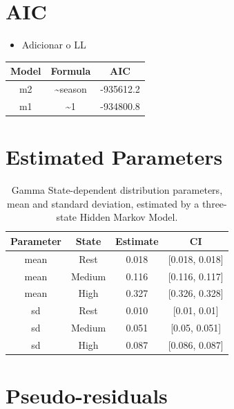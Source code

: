 \documentclass[msc,numbers,hidelinks]{coppe}
\providecommand{\tightlist}{
  \setlength{\itemsep}{0pt}\setlength{\parskip}{0pt}}
\begin{document}
  \hypertarget{aic}{%
  \section{AIC}\label{aic}}
  \begin{itemize}
  \tightlist
  \item
    Adicionar o LL
  \end{itemize}
  \begin{table}[!h]
  \centering
  \begin{tabular}{ccc}
  \toprule
  Model & Formula & AIC\\
  \midrule
  m2 & \textasciitilde{}season & -935612.2\\
  m1 & \textasciitilde{}1 & -934800.8\\
  \bottomrule
  \end{tabular}
  \end{table}
  \hypertarget{estimated-parameters}{%
  \section{Estimated Parameters}\label{estimated-parameters}}
  \begin{table}[!h]

  \caption{\label{tab:appendix-parameters}Gamma State-dependent distribution parameters, mean and standard deviation, estimated by a three-state Hidden Markov Model.}
  \centering
  \begin{tabular}[t]{cccc}
  \toprule
  Parameter & State & Estimate & CI\\
  \midrule
  mean & Rest & 0.018 & {}[0.018, 0.018]\\
  mean & Medium & 0.116 & {}[0.116, 0.117]\\
  mean & High & 0.327 & {}[0.326, 0.328]\\
  sd & Rest & 0.010 & {}[0.01, 0.01]\\
  sd & Medium & 0.051 & {}[0.05, 0.051]\\
  \addlinespace
  sd & High & 0.087 & {}[0.086, 0.087]\\
  \bottomrule
  \end{tabular}
  \end{table}
  \hypertarget{pseudo-residuals}{%
  \section{Pseudo-residuals}\label{pseudo-residuals}}
\end{document}
